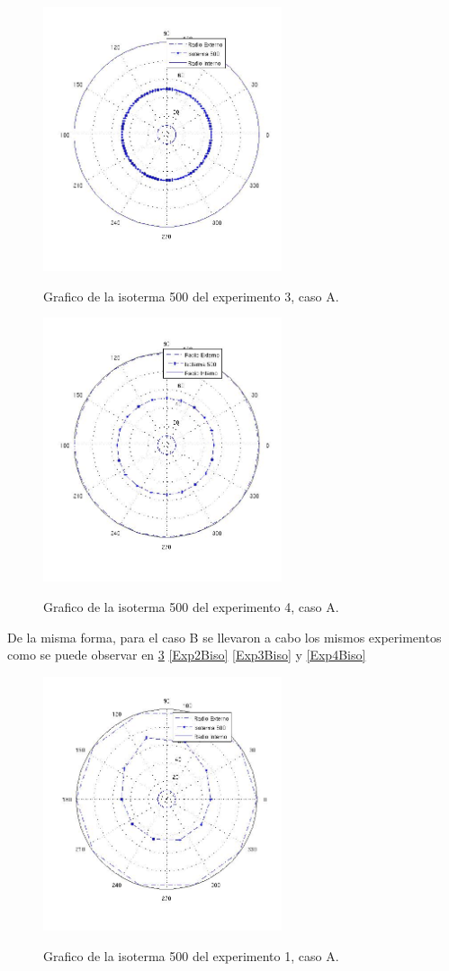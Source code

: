 \documentclass[12pt,a4paper]{article}
\begin{document}
\begin{figure}[h!]
\centering
\caption{Grafico de la isoterma 500 del experimento 3, caso A.}
\includegraphics[width=7cm]{test20100aiso.jpg}
\label{Exp3Aiso}
\end{figure}

\begin{figure}[h!]
\centering
\caption{Grafico de la isoterma 500 del experimento 4, caso A.}
\includegraphics[width=7cm]{test10020aiso.jpg}
\label{Exp4Aiso}
\end{figure}

De la misma forma, para el caso B se llevaron a cabo los mismos experimentos como se puede observar en \ref{Exp1Biso} \ref{Exp2Biso} \ref{Exp3Biso} y \ref{Exp4Biso}

\begin{figure}[h!]
\centering
\caption{Grafico de la isoterma 500 del experimento 1, caso A.}
\includegraphics[width=7cm]{test1010biso.jpg}
\label{Exp1Biso}
\end{figure}
\end{document}
